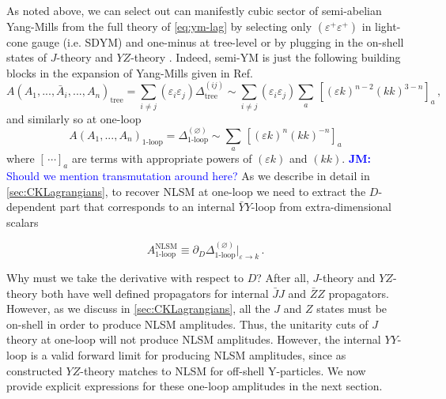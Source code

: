 \documentclass[11pt,letter]{article}
\newcommand{\jm}[1]{\textcolor{blue}{\textbf{JM: }{#1}}}
\begin{document}
As noted above, we can select out can manifestly cubic
sector of semi-abelian Yang-Mills from the full theory of \cref{eq:ym-lag} by selecting only $(\varepsilon^+\varepsilon^+)$ in light-cone gauge (i.e. SDYM) and one-minus at tree-level or by plugging in the on-shell states of $J$-theory \cite{Cheung:2020djz,Cheung:2021zvb} and
$YZ$-theory \cite{Cheung:2016prv}. Indeed, semi-YM is just the following building blocks
in the expansion of Yang-Mills given in Ref.~\cite{Pavao:2022kog}
\begin{equation}
A(A_1,...,\bar{A}_i,...,A_n)_{\text{tree}} = \sum_{i\neq j} (\varepsilon_i \varepsilon_j) \Delta^{(ij)}_{\text{tree}} \sim \sum_{i\neq j} (\varepsilon_i \varepsilon_j)  \sum_a \,[(\varepsilon k)^{n-2} (kk)^{3-n}]_a\,,
\end{equation}
and similarly so at one-loop
\begin{equation}
A(A_1,...,A_n)_{\text{1-loop}} = \Delta^{(\varnothing)}_{\text{1-loop}} \sim \sum_a\,[ (\varepsilon k)^{n} (kk)^{-n}]_a
\end{equation}
where $[\,\cdots]_a$ are terms with appropriate powers of $(\varepsilon k)$ and $(kk)$. \jm{Should we mention transmutation around here?} As we describe in detail in \cref{sec:CKLagrangians}, to recover NLSM at one-loop we need to extract the $D$-dependent part
that corresponds to an internal $\bar{Y}Y$-loop from extra-dimensional
scalars
\begin{eBox}
\begin{equation}
A^{\text{NLSM}}_{\text{1-loop}} \equiv \partial_D \Delta^{(\varnothing)}_{\text{1-loop}}\big|_{\varepsilon\rightarrow k}\, .
\end{equation}
\end{eBox}
Why must we take the derivative with respect to $D$? After all,
$J$-theory and $YZ$-theory both have well defined propagators for
internal $\bar{J}J$ and $\bar{Z}Z$ propagators. However, as we discuss
in \cref{sec:CKLagrangians}, all the $J$ and $Z$ states must be on-shell in order to
produce NLSM amplitudes. Thus, the unitarity cuts of $J$ theory at
one-loop will not produce NLSM amplitudes. However, the internal
$YY$-loop is a valid forward limit for producing NLSM amplitudes,
since as constructed $YZ$-theory matches to NLSM for off-shell
Y-particles. We now provide explicit expressions for these one-loop amplitudes in the next section.
\end{document}
